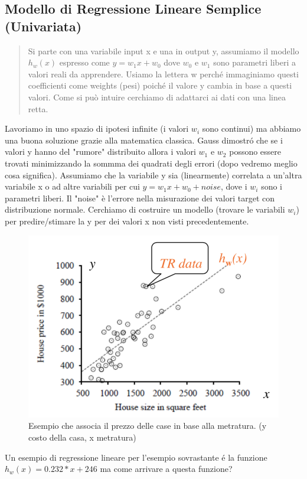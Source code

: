 \documentclass{article}
\begin{document}
\subsection{Modello di Regressione Lineare Semplice (Univariata)}
\begin{quote}
    Si parte con una variabile input x e una in output y, assumiamo il modello $h_w(x)$ espresso come $y=w_1x+w_0$ dove $w_0$ e $w_1$ sono parametri liberi a valori reali da apprendere. Usiamo la lettera w perché immaginiamo questi coefficienti come weights (pesi) poiché il valore y cambia in base a questi valori. Come si può intuire cerchiamo di adattarci ai dati con una linea retta.
\end{quote}
Lavoriamo in uno spazio di ipotesi infinite (i valori $w_i$ sono continui) ma abbiamo una buona soluzione grazie alla matematica classica. Gauss dimostró che se i valori y hanno del "rumore" distribuito allora i valori $w_1$ e $w_2$ possono essere trovati minimizzando la sommma dei quadrati degli errori (dopo vedremo meglio cosa significa). \newline
Assumiamo che la variabile y sia (linearmente) correlata a un'altra variabile x o ad altre variabili per cui $y = w_1x + w_0 + noise$, dove i $w_i$ sono i parametri liberi. Il "noise" è l'errore nella misurazione dei valori target con distribuzione normale. Cerchiamo di costruire un modello (trovare le variabili $w_i$) per predire/stimare la y per dei valori x non visti precedentemente.
\begin{figure}[H]
    \centering
    \includegraphics[scale=0.5]{Images/regresslincase1.png}
    \caption{Esempio che associa il prezzo delle case in base alla metratura. (y costo della casa, x metratura)}
\end{figure}
Un esempio di regressione lineare per l'esempio sovrastante é la funzione $h_w(x)=0.232*x+246$ ma come arrivare a questa funzione?
\end{document}

